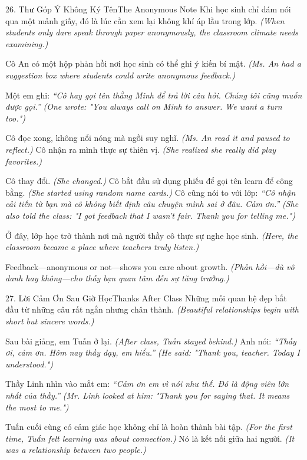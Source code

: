 \begin{truyen}{26. Thư Góp Ý Không Ký Tên}{The Anonymous Note}
Khi học sinh chỉ dám nói qua một mảnh giấy, đó là lúc cần xem lại không khí áp lầu trong lớp.
\textit{(When students only dare speak through paper anonymously, the classroom climate needs examining.)}

Cô An có một hộp phản hồi nơi học sinh có thể ghi ý kiến bí mật.
\textit{(Ms. An had a suggestion box where students could write anonymous feedback.)}

Một em ghi: \textit{``Cô hay gọi tên thằng Minh để trả lời câu hỏi. Chúng tôi cũng muốn được gọi.''}
\textit{(One wrote: "You always call on Minh to answer. We want a turn too.")}

Cô đọc xong, không nổi nóng mà ngồi suy nghĩ.
\textit{(Ms. An read it and paused to reflect.)}
Cô nhận ra mình thực sự thiên vị.
\textit{(She realized she really did play favorites.)}

Cô thay đổi.
\textit{(She changed.)}
Cô bắt đầu sử dụng phiếu để gọi tên learn để công bằng.
\textit{(She started using random name cards.)}
Cô cũng nói to với lớp: \textit{``Cô nhận cải tiến từ bạn mà cô không biết định câu chuyện mình sai ở đâu. Cảm ơn.''}
\textit{(She also told the class: "I got feedback that I wasn't fair. Thank you for telling me.")}

Ở đây, lớp học trở thành nơi mà người thầy cô thực sự nghe học sinh.
\textit{(Here, the classroom became a place where teachers truly listen.)}
\end{truyen}

\begin{baihoc}
Feedback—anonymous or not—shows you care about growth.
\textit{(Phản hồi—dù vô danh hay không—cho thấy bạn quan tâm đến sự tăng trưởng.)}
\end{baihoc}

\begin{truyen}{27. Lời Cảm Ơn Sau Giờ Học}{Thanks After Class}
Những mối quan hệ đẹp bắt đầu từ những câu rất ngắn nhưng chân thành.
\textit{(Beautiful relationships begin with short but sincere words.)}

Sau bài giảng, em Tuấn ở lại.
\textit{(After class, Tuấn stayed behind.)}
Anh nói: \textit{``Thầy ơi, cảm ơn. Hôm nay thầy dạy, em hiểu.''}
\textit{(He said: "Thank you, teacher. Today I understood.")}

Thầy Linh nhìn vào mắt em: \textit{``Cảm ơn em vì nói như thế. Đó là động viên lớn nhất của thầy.''}
\textit{(Mr. Linh looked at him: "Thank you for saying that. It means the most to me.")}

Tuấn cuối cùng có cảm giác học không chỉ là hoàn thành bài tập.
\textit{(For the first time, Tuấn felt learning was about connection.)}
Nó là kết nối giữa hai người.
\textit{(It was a relationship between two people.)}
\end{truyen}

